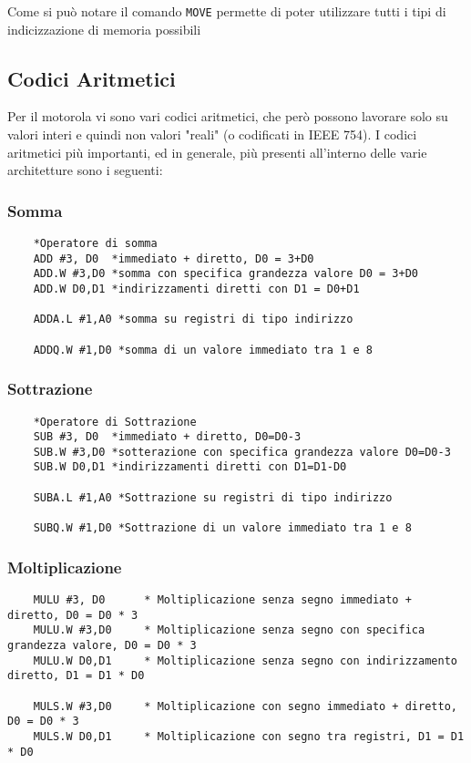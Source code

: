 Come si può notare il comando \lstinline|MOVE| permette di poter utilizzare tutti i tipi di indicizzazione di memoria possibili

\newpage

\subsection{Codici Aritmetici}
Per il motorola vi sono vari codici aritmetici, che però possono lavorare solo su valori interi e quindi non valori "reali" (o codificati in IEEE 754).
I codici aritmetici più importanti, ed in generale, più presenti all'interno delle varie architetture sono i seguenti:

\subsubsection{Somma}

\begin{lstlisting}
    *Operatore di somma
    ADD #3, D0  *immediato + diretto, D0 = 3+D0
    ADD.W #3,D0 *somma con specifica grandezza valore D0 = 3+D0
    ADD.W D0,D1 *indirizzamenti diretti con D1 = D0+D1

    ADDA.L #1,A0 *somma su registri di tipo indirizzo

    ADDQ.W #1,D0 *somma di un valore immediato tra 1 e 8
\end{lstlisting}

\subsubsection{Sottrazione}

\begin{lstlisting}
    *Operatore di Sottrazione
    SUB #3, D0  *immediato + diretto, D0=D0-3
    SUB.W #3,D0 *sotterazione con specifica grandezza valore D0=D0-3
    SUB.W D0,D1 *indirizzamenti diretti con D1=D1-D0

    SUBA.L #1,A0 *Sottrazione su registri di tipo indirizzo

    SUBQ.W #1,D0 *Sottrazione di un valore immediato tra 1 e 8
\end{lstlisting}

\subsubsection{Moltiplicazione}

\begin{lstlisting}
    MULU #3, D0      * Moltiplicazione senza segno immediato + diretto, D0 = D0 * 3
    MULU.W #3,D0     * Moltiplicazione senza segno con specifica grandezza valore, D0 = D0 * 3
    MULU.W D0,D1     * Moltiplicazione senza segno con indirizzamento diretto, D1 = D1 * D0

    MULS.W #3,D0     * Moltiplicazione con segno immediato + diretto, D0 = D0 * 3
    MULS.W D0,D1     * Moltiplicazione con segno tra registri, D1 = D1 * D0
\end{lstlisting}

